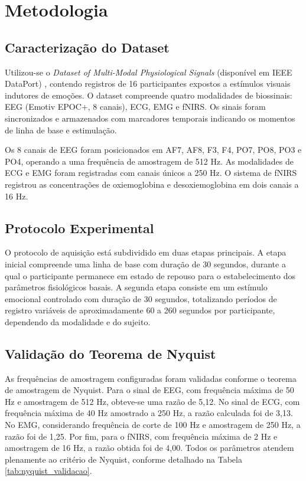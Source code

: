 \chapter{Metodologia}
\label{chap:metodologia}

\section{Caracterização do Dataset}

Utilizou-se o \textit{Dataset of Multi-Modal Physiological Signals} 
(disponível em IEEE DataPort) \cite{naser2023multimodal}, contendo registros 
de 16 participantes expostos a estímulos visuais indutores de emoções. O 
dataset compreende quatro modalidades de biossinais: EEG (Emotiv EPOC+, 8 canais), 
ECG, EMG e fNIRS. Os sinais foram sincronizados e armazenados com marcadores 
temporais indicando os momentos de linha de base e estimulação.

Os 8 canais de EEG foram posicionados em AF7, AF8, F3, F4, PO7, PO8, PO3 e PO4, 
operando a uma frequência de amostragem de 512 Hz. As modalidades de ECG e EMG 
foram registradas com canais únicos a 250 Hz. O sistema de fNIRS registrou as 
concentrações de oxiemoglobina e desoxiemoglobina em dois canais a 16 Hz.

\section{Protocolo Experimental}

O protocolo de aquisição está subdividido em duas etapas principais. A etapa inicial compreende uma linha de base com duração de 30 segundos, durante a qual o participante permanece em estado de repouso para o estabelecimento dos parâmetros fisiológicos basais. A segunda etapa consiste em um estímulo emocional controlado com duração de 30 segundos, totalizando períodos de registro variáveis de aproximadamente 60 a 260 segundos por participante, dependendo da modalidade e do sujeito.

\section{Validação do Teorema de Nyquist}

As frequências de amostragem configuradas foram validadas conforme o teorema de amostragem de Nyquist. Para o sinal de EEG, com frequência máxima de 50 Hz e amostragem de 512 Hz, obteve-se uma razão de 5,12. No sinal de ECG, com frequência máxima de 40 Hz amostrado a 250 Hz, a razão calculada foi de 3,13. No EMG, considerando frequência de corte de 100 Hz e amostragem de 250 Hz, a razão foi de 1,25. Por fim, para o fNIRS, com frequência máxima de 2 Hz e amostragem de 16 Hz, a razão obtida foi de 4,00. Todos os parâmetros atendem plenamente ao critério de Nyquist, conforme detalhado na Tabela \ref{tab:nyquist_validacao}.

